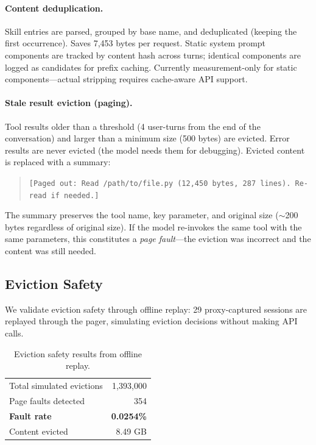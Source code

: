 \paragraph{Content deduplication.}
Skill entries are parsed, grouped by base name, and deduplicated
(keeping the first occurrence). Saves 7{,}453 bytes per request.
Static system prompt components are tracked by content hash across
turns; identical components are logged as candidates for prefix
caching. Currently measurement-only for static components---actual
stripping requires cache-aware API support.

\paragraph{Stale result eviction (paging).}
Tool results older than a threshold (4 user-turns from the end of
the conversation) and larger than a minimum size (500 bytes) are
evicted. Error results are never evicted (the model needs them for
debugging). Evicted content is replaced with a summary:
\begin{quote}
\small
\texttt{[Paged out: Read /path/to/file.py (12{,}450 bytes, 287
  lines). Re-read if needed.]}
\end{quote}
The summary preserves the tool name, key parameter, and original
size ($\sim$200 bytes regardless of original size). If the model
re-invokes the same tool with the same parameters, this constitutes
a \emph{page fault}---the eviction was incorrect and the content
was still needed.

\subsection{Eviction Safety}
\label{sec:eviction}

We validate eviction safety through offline replay: 29
proxy-captured sessions are replayed through the pager, simulating
eviction decisions without making API calls.

\begin{table}[ht]
\centering
\caption{Eviction safety results from offline replay.}
\label{tab:eviction}
\small
\begin{tabular}{@{}lr@{}}
\toprule
Total simulated evictions & 1{,}393{,}000 \\
Page faults detected & 354 \\
\textbf{Fault rate} & \textbf{0.0254\%} \\
Content evicted & 8.49 GB \\
\bottomrule
\end{tabular}
\end{table}

